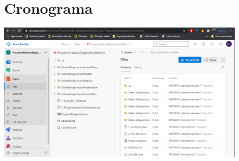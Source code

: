 \documentclass[preprint,12pt]{elsarticle}
\begin{document}
\section{Cronograma }

	\begin{center}
	\includegraphics[width=12cm]{./imagen/20} 
	\end{center}
\end{document}
